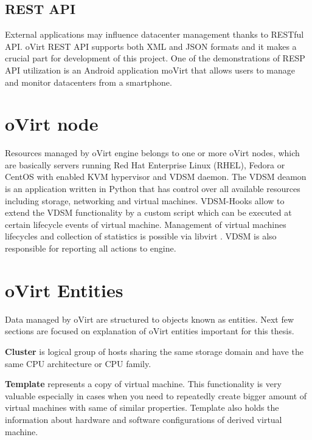 \newpage
\subsection{REST API}
External applications may influence datacenter management thanks to RESTful API. oVirt REST API supports both XML and JSON formats and it makes a crucial part for development of this project. One of the demonstrations of RESP API utilization is an Android application moVirt that allows users to manage and monitor datacenters from a smartphone.

\section{oVirt node}
Resources managed by oVirt engine belongs to one or more oVirt nodes, which are basically servers running Red Hat Enterprise Linux (RHEL), Fedora or CentOS with enabled KVM \cite{kvm} hypervisor and VDSM daemon. The VDSM deamon is an application written in Python that has control over all available resources including storage, networking and virtual machines. VDSM-Hooks \cite{hooks} allow to extend the VDSM functionality by a custom script which can be executed at certain lifecycle events of virtual machine. Management of virtual machines lifecycles and collection of statistics is possible via libvirt \cite{libvirt}. VDSM is also responsible for reporting all actions to engine.

\section{oVirt Entities}
Data managed by oVirt are structured to objects known as entities. Next few sections are focused on explanation of oVirt entities important for this thesis.

\textbf{Cluster} is logical group of hosts sharing the same storage domain and have the same CPU architecture or CPU family.

\textbf{Template} represents a copy of virtual machine. This functionality is very valuable especially in cases when you need to repeatedly create bigger amount of virtual machines with same of similar properties. Template also holds the information about hardware and software configurations of derived virtual machine. 

